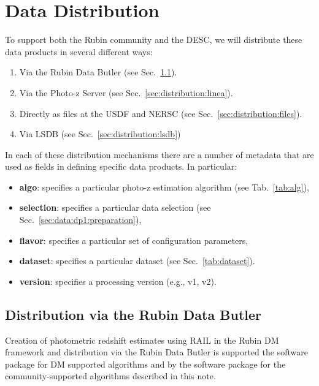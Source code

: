 \section{Data Distribution}
\label{sec:distribution:0}

To support both the Rubin community and the DESC, we will distribute these data products in several different ways:
\begin{enumerate}
\item{Via the Rubin Data Butler (see Sec.~\ref{sec:distribution:butler}).}
\item{Via the Photo-z Server (see Sec.~\ref{sec:distribution:linea}).}
\item{Directly as files at the USDF and NERSC (see Sec.~\ref{sec:distribution:files}).}
\item{Via LSDB (see Sec.~\ref{sec:distribution:lsdb})}
\end{enumerate}

In each of these distribution mechanisms there are a number of metadata that are used as fields in defining specific data products.  In particular:

\begin{itemize}
\item{\textbf{algo}: specifies a particular photo-z estimation algorithm (see Tab.~\ref{tab:alg}),}
\item{\textbf{selection}: specifies a particular data selection (see Sec.~\ref{sec:data:dp1:preparation}),}
\item{\textbf{flavor}: specifies a particular set of configuration parameters,}
\item{\textbf{dataset}: specifies a particular dataset (see Sec.~\ref{tab:dataset}).}
\item{\textbf{version}: specifies a processing version (e.g., v1, v2).}
\end{itemize}


\subsection{Distribution via the Rubin Data Butler}
\label{sec:distribution:butler}

Creation of photometric redshift estimates using RAIL in the Rubin DM framework and distribution via the Rubin Data Butler is supported the \href{https://github.com/lsst-dm/meas_pz}{} software package for DM supported algorithms and by the \href{https://github.com/lsst-dm/meas_pz}{} software package for the community-supported algorithms described in this note.

